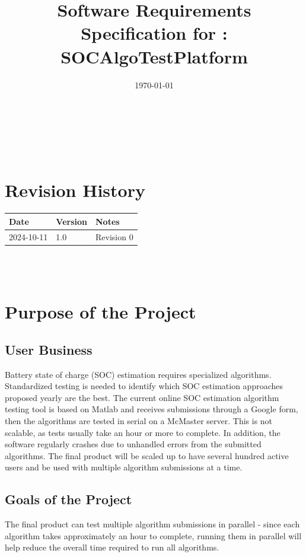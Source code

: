 \documentclass[12pt]{article}
\begin{document}
\title{Software Requirements Specification for \progname: SOCAlgoTestPlatform} 
\author{\authname}
\date{\today}
	
\maketitle

~\newpage


\tableofcontents

~\newpage

\section*{Revision History}

\begin{tabularx}{\textwidth}{p{3cm}p{2cm}X}
\toprule {\textbf{Date}} & {\textbf{Version}} & {\textbf{Notes}}\\
\midrule
2024-10-11 & 1.0 & Revision 0\\
\bottomrule
\end{tabularx}

~\\

~\newpage
\section{Purpose of the Project}
\subsection{User Business}
Battery state of charge (SOC) estimation requires specialized algorithms. Standardized testing is needed to identify which SOC estimation approaches proposed yearly are the best. The current online SOC estimation algorithm testing tool is based on Matlab and receives submissions through a Google form, then the algorithms are tested in serial on a McMaster server. This is not scalable, as tests usually take an hour or more to complete. In addition, the software regularly crashes due to unhandled errors from the submitted algorithms. The final product will be scaled up to have several hundred active users and be used with multiple algorithm submissions at a time.
\subsection{Goals of the Project}

    The final product can test multiple algorithm submissions in parallel - since each algorithm takes approximately an hour to complete, running them in parallel will help reduce the overall time required to run all algorithms.
    
\end{document}
